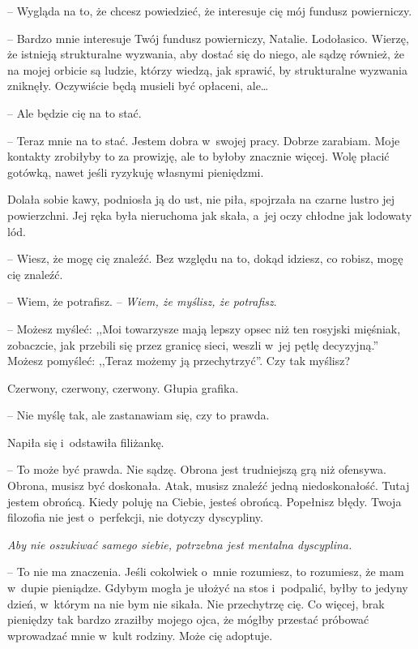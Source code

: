 \documentclass[oneside,polish,11pt,sfheadings]{mwbk}
\begin{document}
-- Wygląda na to, że chcesz powiedzieć, że interesuje cię mój fundusz
powierniczy.

-- Bardzo mnie interesuje Twój fundusz powierniczy, Natalie. Lodołasico.
Wierzę, że istnieją strukturalne wyzwania, aby dostać się do niego, ale
sądzę również, że na mojej orbicie są ludzie, którzy wiedzą, jak
sprawić, by strukturalne wyzwania zniknęły. Oczywiście będą musieli być
opłaceni, ale\ldots 

-- Ale będzie cię na to stać.

-- Teraz mnie na to stać. Jestem dobra w~swojej pracy. Dobrze zarabiam.
Moje kontakty zrobiłyby to za prowizję, ale to byłoby znacznie więcej.
Wolę płacić gotówką, nawet jeśli ryzykuję własnymi pieniędzmi.

Dolała sobie kawy, podniosła ją do ust, nie piła, spojrzała na czarne
lustro jej powierzchni. Jej ręka była nieruchoma jak skała, a~jej oczy
chłodne jak lodowaty lód. 

-- Wiesz, że mogę cię znaleźć. Bez względu na
to, dokąd idziesz, co robisz, mogę cię znaleźć.

-- Wiem, że potrafisz. -- \textit{Wiem, że myślisz, że potrafisz}.

-- Możesz myśleć: ,,Moi towarzysze mają lepszy opsec niż ten rosyjski
mięśniak, zobaczcie, jak przebili się przez granicę sieci, weszli w~jej
pętlę decyzyjną.'' Możesz pomyśleć: ,,Teraz możemy ją przechytrzyć''.
Czy tak myślisz?

Czerwony, czerwony, czerwony. Głupia grafika. 

-- Nie myślę tak, ale
zastanawiam się, czy to prawda.

Napiła się i~odstawiła filiżankę. 

-- To może być prawda. Nie sądzę.
Obrona jest trudniejszą grą niż ofensywa. Obrona, musisz być doskonała.
Atak, musisz znaleźć jedną niedoskonałość. Tutaj jestem obrońcą. Kiedy
poluję na Ciebie, jesteś obrońcą. Popełnisz błędy. Twoja filozofia nie
jest o~perfekcji, nie dotyczy dyscypliny.

\textit{Aby nie oszukiwać samego siebie, potrzebna jest mentalna
dyscyplina.}

-- To nie ma znaczenia. Jeśli cokolwiek o~mnie rozumiesz, to rozumiesz,
że mam w~dupie pieniądze. Gdybym mogła je ułożyć na stos i~podpalić,
byłby to jedyny dzień, w~którym na nie bym nie sikała. Nie przechytrzę
cię. Co więcej, brak pieniędzy tak bardzo zraziłby mojego ojca, że
mógłby przestać próbować wprowadzać mnie w~kult rodziny. Może cię
adoptuje.
\end{document}
